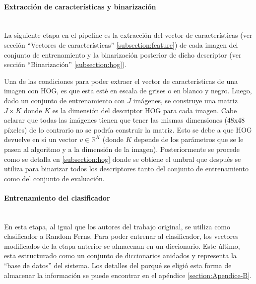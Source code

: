 
		\paragraph{Extracción de características y binarización} ~\\
		
			La siguiente etapa en el pipeline es la extracción del vector de características (ver sección ``Vectores de características'' \ref{subsection:feature}) de cada imagen del conjunto de entrenamiento y la binarización posterior de dicho descriptor (ver sección ``Binarización'' \ref{subsection:hog}).
			
			Una de las condiciones para poder extraer el vector de características de una imagen con HOG, es que esta esté en escala de grises o en blanco y negro. Luego, dado un conjunto de entrenamiento con $J$ imágenes, se construye una matriz $J \times K$ donde $K$ es la dimensión del descriptor HOG para cada imagen. Cabe aclarar que todas las imágenes tienen que tener las mismas dimensiones (48x48 píxeles) de lo contrario no se podría construir la matriz. Esto se debe a que HOG devuelve en sí un vector $v \in \mathbb{R}^{K}$ (donde $K$ depende de los parámetros que se le pasen al algoritmo y a la dimensión de la imagen). Posteriormente se procede como se detalla en \ref{subsection:hog} donde se obtiene el umbral que después se utiliza para binarizar todos los descriptores tanto del conjunto de entrenamiento como del conjunto de evaluación.
			
		

		\paragraph{Entrenamiento del clasificador}  ~\\

			En esta etapa, al igual que los autores del trabajo original, se utiliza como clasificador a Random Ferns. Para poder entrenar al clasificador, los vectores modificados de la etapa anterior se almacenan en un diccionario. Este último, esta estructurado como un conjunto de diccionarios anidados y representa la ``base de datos'' del sistema. Los detalles del porqué se eligió esta forma de almacenar la información se puede encontrar en el apéndice \ref{section:Apendice-B}.

